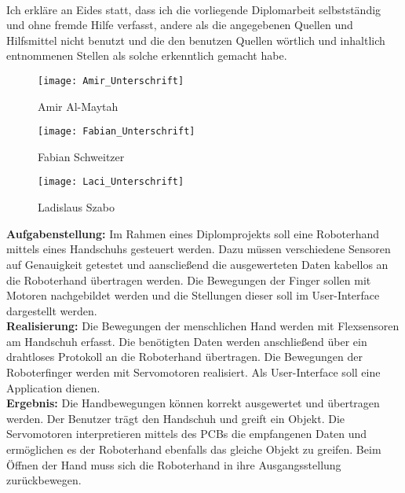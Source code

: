 \documentclass[11pt]{article}
\begin{document}
\hfill \break
\\
Ich erkläre an Eides statt, dass ich die vorliegende Diplomarbeit selbstständig und ohne fremde Hilfe verfasst, 
andere als die angegebenen Quellen und Hilfsmittel nicht benutzt und die den benutzen Quellen wörtlich und 
inhaltlich entnommenen Stellen als solche erkenntlich gemacht habe.\\
\hfill \break
\hfill \break
\hfill \break
\hfill \break
\begin{figure}[h]
	\begin{center}
		\scalebox{0.5}
		{\texttt{[image: Amir\_Unterschrift]}}
		\caption*{Amir Al-Maytah}
	\end{center}
\end{figure}
\begin{figure}[h]
	\begin{center}
		\scalebox{0.5}
		{\texttt{[image: Fabian\_Unterschrift]}}
		\caption*{Fabian Schweitzer}
	\end{center}
\end{figure}
\begin{figure}[h]
	\begin{center}
		\scalebox{0.5}
		{\texttt{[image: Laci\_Unterschrift]}}
		\caption*{Ladislaus Szabo}
	\end{center}
\end{figure}

\pagebreak


\thispagestyle{empty}

\textbf{Aufgabenstellung:} 
Im Rahmen eines Diplomprojekts soll eine Roboterhand mittels eines Handschuhs gesteuert werden. 
Dazu müssen verschiedene Sensoren auf Genauigkeit getestet und aanscließend die ausgewerteten Daten kabellos an die
Roboterhand übertragen werden. Die Bewegungen der Finger sollen mit Motoren nachgebildet werden und die Stellungen
dieser soll im User-Interface dargestellt werden. \\
\textbf{Realisierung:} 
Die Bewegungen der menschlichen Hand werden mit Flexsensoren am Handschuh erfasst. Die benötigten Daten werden
anschließend über ein drahtloses Protokoll an die Roboterhand übertragen. Die Bewegungen der Roboterfinger werden mit
Servomotoren realisiert. Als User-Interface soll eine Application dienen. \\
\textbf{Ergebnis:} 
Die Handbewegungen können korrekt ausgewertet und übertragen werden. Der Benutzer trägt den Handschuh und greift 
ein Objekt. Die Servomotoren interpretieren mittels des PCBs die empfangenen Daten und ermöglichen es der Roboterhand 
ebenfalls das gleiche Objekt zu greifen. Beim Öffnen der Hand muss sich die Roboterhand in ihre Ausgangsstellung 
zurückbewegen. \\
\\
\end{document}
